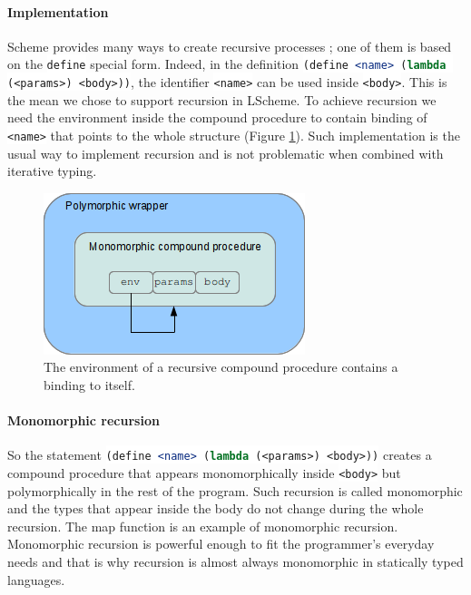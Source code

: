 \documentclass[a4paper]{report}
\newcommand{\ischeme}[1]{\colorbox{white}{\lstinline[language=scheme]&#1&}} %
\newcommand{\reffig}[1]{(Figure \ref{#1})}
\begin{document}
\paragraph{Implementation} Scheme provides many ways to create recursive processes ; one of them is based on the \ischeme{define} special form. Indeed, in the definition \ischeme{(define <name> (lambda (<params>) <body>))}, the identifier \ischeme{<name>} can be used inside \ischeme{<body>}. This is the mean we chose to support recursion in LScheme. To achieve recursion we need the environment inside the compound procedure to contain binding of \ischeme{<name>} that points to the whole structure \reffig{mono_rec}. Such implementation is the usual way to implement recursion and is not problematic when combined with iterative typing.

\begin{figure}
\centering
\includegraphics{images/mono_rec.png}
\caption{The environment of a recursive compound procedure contains a binding to itself.}
\label{mono_rec}
\end{figure}

\paragraph{Monomorphic recursion} So the statement \ischeme{(define <name> (lambda (<params>) <body>))} creates a compound procedure that appears monomorphically inside \ischeme{<body>} but polymorphically in the rest of the program. Such recursion is called monomorphic and the types that appear inside the body do not change during the whole recursion. The map function is an example of monomorphic recursion. Monomorphic recursion is powerful enough to fit the programmer's everyday needs and that is why recursion is almost always monomorphic in statically typed languages.
\end{document}
